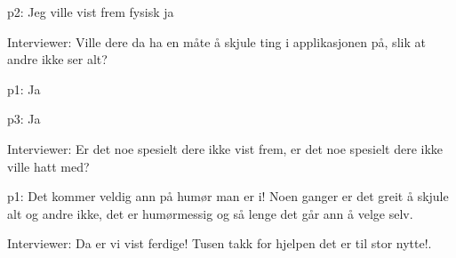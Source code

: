 \documentclass[11pt, norsk, a4paper]{article}
\begin{document}
\textcolor{myYellow} {p2: }Jeg ville vist frem fysisk ja


\textcolor{myBlue} {Interviewer: }Ville dere da ha en måte å skjule ting i applikasjonen på, slik at andre ikke ser alt?


\textcolor{myGreen} {p1: }Ja


\textcolor{myR} {p3: }Ja


\textcolor{myBlue} {Interviewer: }Er det noe spesielt dere ikke vist frem, er det noe spesielt dere ikke ville hatt med?


\textcolor{myGreen} {p1: }Det kommer veldig ann på humør man er i! Noen ganger er det greit å skjule alt og andre ikke, det er humørmessig og så lenge det går ann å velge selv. 


\textcolor{myBlue} {Interviewer: }Da er vi vist ferdige! Tusen takk for hjelpen det er til stor nytte!.
\end{document}
